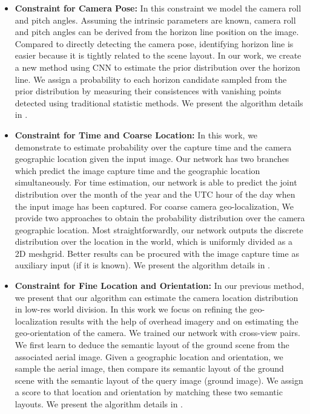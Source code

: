 \begin{itemize}[noitemsep]
  \item \textbf{Constraint for Camera Pose:}
  In this constraint we model the camera roll and pitch angles.
  Assuming the intrinsic parameters are known, camera roll and pitch
  angles can be derived from the horizon line position on the image.
  Compared to directly detecting the camera pose, identifying horizon
  line is easier because it is tightly related to the scene layout.
  In our work, we create a new method using CNN to estimate the
  prior distribution over the horizon line. We assign a probability to
  each horizon candidate sampled from the prior distribution by
  measuring their consistences with vanishing points detected using
  traditional statistic methods. We present the algorithm details in
  .  \newline

  \item \textbf{Constraint for Time and Coarse Location:}
  In this work, we demonstrate to estimate probability over the
  capture time and the camera geographic location given the input image.
  Our network has two branches which predict the image
  capture time and the geographic location simultaneously.
  For time estimation, our network is able to predict the
  joint distribution over the month of the year and the UTC hour of the
  day when the input image has been captured.
  For coarse camera geo-localization, We provide two approaches to
  obtain the probability distribution over the camera geographic
  location. Most straightforwardly, our network outputs the discrete
  distribution over the location in the world, which is uniformly
  divided as a 2D meshgrid. Better results can be procured with the
  image capture time as auxiliary input (if it is known). 
  We present the algorithm details in .
  \newline

  \item \textbf{Constraint for Fine Location and Orientation:}
  In our previous method, we present that our algorithm can estimate
  the camera location distribution in low-res world division. In this
  work we focus on refining the geo-localization results with the help
  of overhead imagery and on estimating the geo-orientation of the camera. 
  We trained our network with cross-view pairs.
  We first learn to deduce the semantic layout of the ground
  scene from the associated aerial image.
  Given a geographic location and orientation, we sample the aerial
  image, then compare its semantic layout of the ground scene
  with the semantic layout of the query image (ground image).
  We assign a score to that location and orientation by matching these
  two semantic layouts.
  We present the algorithm details in .
  \newline

\end{itemize}


